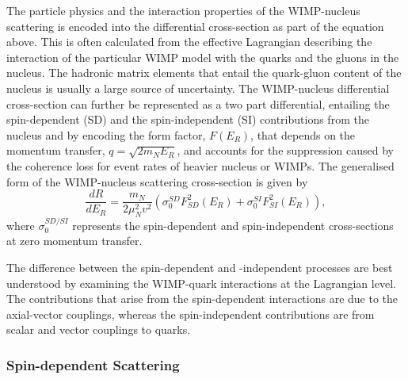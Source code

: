 The particle physics and the interaction properties of the WIMP-nucleus scattering is encoded into the differential cross-section as part of the equation above. This is often calculated from the effective Lagrangian describing the interaction of the particular WIMP model with the quarks and the gluons in the nucleus. The hadronic matrix elements that entail the quark-gluon content of the nucleus is usually a large source of uncertainty. The WIMP-nucleus differential cross-section can further be represented as a two part differential, entailing the spin-dependent (SD) and the spin-independent (SI) contributions from the nucleus and by encoding the form factor, $F(E_{R})$, that depends on the momentum transfer, $q=\sqrt{2m_{N}E_{R}}$, and accounts for the suppression caused by the coherence loss for event rates of heavier nucleus or WIMPs. The generalised form of the WIMP-nucleus scattering cross-section is given by
%
\begin{equation} \label{eq:dependent_and_independent}
    \frac{dR}{dE_{R}} = \frac{m_{N}}{2\mu^{2}_{N}v^{2}} \left(\sigma_{0}^{SD}F^{2}_{SD}(E_{R}) + \sigma_{0}^{SI}F^{2}_{SI}(E_{R})\right),
\end{equation}
%
where $\sigma_{0}^{SD/SI}$ represents the spin-dependent and spin-independent cross-sections at zero momentum transfer.

The difference between the spin-dependent and -independent processes are best understood by examining the WIMP-quark interactions at the Lagrangian level. The contributions that arise from the spin-dependent interactions are due to the axial-vector couplings, whereas the spin-independent contributions are from scalar and vector couplings to quarks.

\subsubsection{Spin-dependent Scattering}
\label{subsec:SI_scatter}

